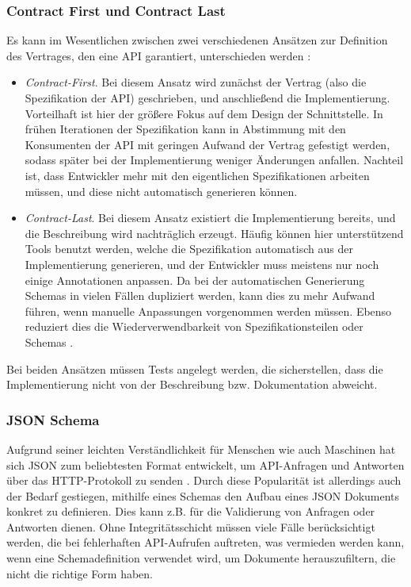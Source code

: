 \subsubsection{Contract First und Contract Last}

Es kann im Wesentlichen zwischen zwei verschiedenen Ansätzen zur Definition des Vertrages, den eine API garantiert, unterschieden werden \parencite[272]{spichale2017api}:

\begin{itemize}
	\item \emph{Contract-First}. Bei diesem Ansatz wird zunächst der Vertrag (also die Spezifikation der API) geschrieben, und anschließend die Implementierung. Vorteilhaft ist hier der größere Fokus auf dem Design der Schnittstelle. In frühen Iterationen der Spezifikation kann in Abstimmung mit den Konsumenten der API mit geringen Aufwand der Vertrag gefestigt werden, sodass später bei der Implementierung weniger Änderungen anfallen. Nachteil ist, dass Entwickler mehr mit den eigentlichen Spezifikationen arbeiten müssen, und diese nicht automatisch generieren können.
	\item \emph{Contract-Last}. Bei diesem Ansatz existiert die Implementierung bereits, und die Beschreibung wird nachträglich erzeugt. Häufig können hier unterstützend Tools benutzt werden, welche die Spezifikation automatisch aus der Implementierung generieren, und der Entwickler muss meistens nur noch einige Annotationen anpassen. Da bei der automatischen Generierung Schemas in vielen Fällen dupliziert werden, kann dies zu mehr Aufwand führen, wenn manuelle Anpassungen vorgenommen werden müssen. Ebenso reduziert dies die Wiederverwendbarkeit von Spezifikationsteilen oder Schemas \parencite[1]{zhong2009contract}.
\end{itemize}

Bei beiden Ansätzen müssen Tests angelegt werden, die sicherstellen, dass die Implementierung nicht von der Beschreibung bzw. Dokumentation abweicht.

\subsubsection{JSON Schema}

Aufgrund seiner leichten Verständlichkeit für Menschen wie auch Maschinen hat sich JSON zum beliebtesten Format entwickelt, um API-Anfragen und Antworten über das HTTP-Protokoll zu senden \parencite[263]{pezoa2016foundations}. Durch diese Popularität ist allerdings auch der Bedarf gestiegen, mithilfe eines Schemas den Aufbau eines JSON Dokuments konkret zu definieren. Dies kann z.B. für die Validierung von Anfragen oder Antworten dienen. Ohne Integritätsschicht müssen viele Fälle berücksichtigt werden, die bei fehlerhaften API-Aufrufen auftreten, was vermieden werden kann, wenn eine Schemadefinition verwendet wird, um Dokumente herauszufiltern, die nicht die richtige Form haben. \\

